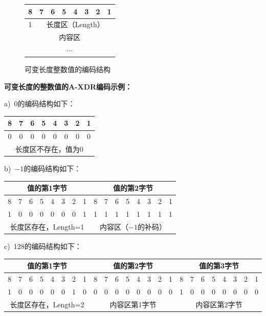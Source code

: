 \documentclass[a4paper,11pt]{ctexart}
\begin{document}
\begin{figure}[htbp]
\centering
\begin{tabular}{|c|c|c|c|c|c|c|c|}
\hline
8 & 7 & 6 & 5 & 4 & 3 & 2 & 1 \\
\hline
\multicolumn{1}{|c|}{1} & \multicolumn{7}{c|}{长度区（Length）} \\
\hline
\multicolumn{8}{|c|}{内容区} \\
\hline
\multicolumn{8}{|c|}{$\cdots$} \\
\hline
\end{tabular}
\caption{可变长度整数值的编码结构}\label{fig:varint}
\end{figure}

\noindent\textbf{可变长度的整数值的A-XDR编码示例：}

a)~0的编码结构如下：

\begin{center}
\begin{tabular}{|c|c|c|c|c|c|c|c|}
\hline
8 & 7 & 6 & 5 & 4 & 3 & 2 & 1 \\
\hline
0 & 0 & 0 & 0 & 0 & 0 & 0 & 0 \\
\hline
\multicolumn{8}{|c|}{长度区不存在，值为0} \\
\hline
\end{tabular}
\end{center}

b)~$-1$的编码结构如下：

\begin{center}
\begin{tabular}{|c|c|c|c|c|c|c|c||c|c|c|c|c|c|c|c|}
\hline
\multicolumn{8}{|c|}{值的第1字节} & \multicolumn{8}{|c|}{值的第2字节} \\
\hline
8 & 7 & 6 & 5 & 4 & 3 & 2 & 1 & 8 & 7 & 6 & 5 & 4 & 3 & 2 & 1 \\
\hline
1 & 0 & 0 & 0 & 0 & 0 & 0 & 1 & 1 & 1 & 1 & 1 & 1 & 1 & 1 & 1 \\
\hline
\multicolumn{8}{|c|}{长度区存在，Length=1} & \multicolumn{8}{|c|}{内容区（$-1$的补码）} \\
\hline
\end{tabular}
\end{center}

c)~128的编码结构如下：

\begin{center}
\begin{tabular}{|c|c|c|c|c|c|c|c||c|c|c|c|c|c|c|c||c|c|c|c|c|c|c|c|}
\hline
\multicolumn{8}{|c|}{值的第1字节} & \multicolumn{8}{|c|}{值的第2字节} & \multicolumn{8}{|c|}{值的第3字节} \\
\hline
8 & 7 & 6 & 5 & 4 & 3 & 2 & 1 & 8 & 7 & 6 & 5 & 4 & 3 & 2 & 1 & 8 & 7 & 6 & 5 & 4 & 3 & 2 & 1 \\
\hline
1 & 0 & 0 & 0 & 0 & 0 & 1 & 0 & 0 & 0 & 0 & 0 & 0 & 0 & 0 & 0 & 1 & 0 & 0 & 0 & 0 & 0 & 0 & 0 \\
\hline
\multicolumn{8}{|c|}{长度区存在，Length=2} & \multicolumn{8}{|c|}{内容区第1字节} & \multicolumn{8}{|c|}{内容区第2字节} \\
\hline
\end{tabular}
\end{center}
\end{document}
